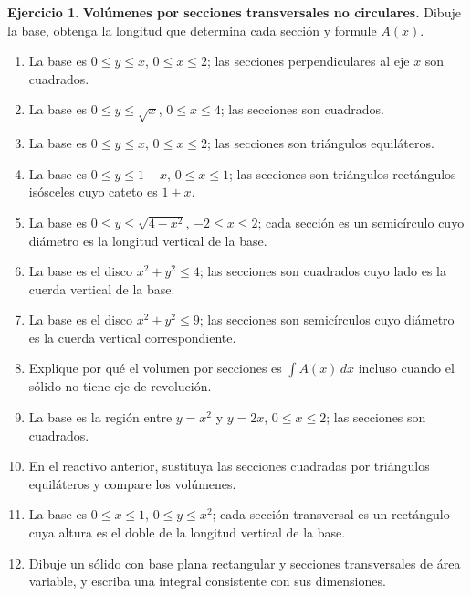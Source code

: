 \documentclass[12pt]{article}
\theoremstyle{definition}
\newtheorem{Ejer}[teorema]{Ejercicio}
\theoremstyle{remark}
\begin{document}
\begin{Ejer}\textbf{Volúmenes por secciones transversales no circulares.} Dibuje la base, obtenga la longitud que determina cada sección y formule $A(x)$.
\begin{enumerate}[resume=banco3]
\item La base es $0\le y\le x$, $0\le x\le2$; las secciones perpendiculares al eje $x$ son cuadrados.
\item La base es $0\le y\le\sqrt x$, $0\le x\le4$; las secciones son cuadrados.
\item La base es $0\le y\le x$, $0\le x\le2$; las secciones son triángulos equiláteros.
\item La base es $0\le y\le1+x$, $0\le x\le1$; las secciones son triángulos rectángulos isósceles cuyo cateto es $1+x$.
\item La base es $0\le y\le\sqrt{4-x^2}$, $-2\le x\le2$; cada sección es un semicírculo cuyo diámetro es la longitud vertical de la base.
\item La base es el disco $x^2+y^2\le4$; las secciones son cuadrados cuyo lado es la cuerda vertical de la base.
\item La base es el disco $x^2+y^2\le9$; las secciones son semicírculos cuyo diámetro es la cuerda vertical correspondiente.
\item Explique por qué el volumen por secciones es $\int A(x)\,dx$ incluso cuando el sólido no tiene eje de revolución.
\item La base es la región entre $y=x^2$ y $y=2x$, $0\le x\le2$; las secciones son cuadrados.
\item En el reactivo anterior, sustituya las secciones cuadradas por triángulos equiláteros y compare los volúmenes.
\item La base es $0\le x\le1$, $0\le y\le x^2$; cada sección transversal es un rectángulo cuya altura es el doble de la longitud vertical de la base.
\item Dibuje un sólido con base plana rectangular y secciones transversales de área variable, y escriba una integral consistente con sus dimensiones.
\end{enumerate}
\end{Ejer}
\end{document}
